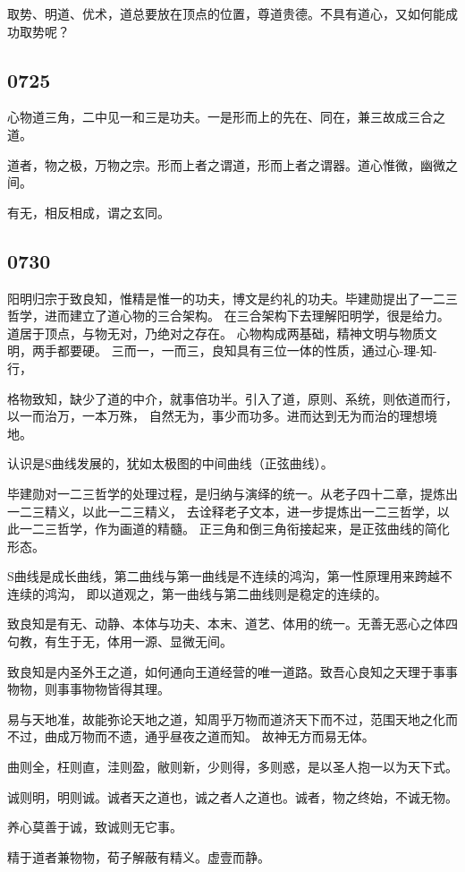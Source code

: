 取势、明道、优术，道总要放在顶点的位置，尊道贵德。不具有道心，又如何能成功取势呢？

\subsection{0725}

心物道三角，二中见一和三是功夫。一是形而上的先在、同在，兼三故成三合之道。

道者，物之极，万物之宗。形而上者之谓道，形而上者之谓器。道心惟微，幽微之间。

有无，相反相成，谓之玄同。



\subsection{0730}

阳明归宗于致良知，惟精是惟一的功夫，博文是约礼的功夫。毕建勋提出了一二三哲学，进而建立了道心物的三合架构。
在三合架构下去理解阳明学，很是给力。道居于顶点，与物无对，乃绝对之存在。
心物构成两基础，精神文明与物质文明，两手都要硬。
三而一，一而三，良知具有三位一体的性质，通过心-理-知-行，

格物致知，缺少了道的中介，就事倍功半。引入了道，原则、系统，则依道而行，以一而治万，一本万殊，
自然无为，事少而功多。进而达到无为而治的理想境地。

认识是S曲线发展的，犹如太极图的中间曲线（正弦曲线）。

毕建勋对一二三哲学的处理过程，是归纳与演绎的统一。从老子四十二章，提炼出一二三精义，以此一二三精义，
去诠释老子文本，进一步提炼出一二三哲学，以此一二三哲学，作为画道的精髓。
正三角和倒三角衔接起来，是正弦曲线的简化形态。

S曲线是成长曲线，第二曲线与第一曲线是不连续的鸿沟，第一性原理用来跨越不连续的鸿沟，
即以道观之，第一曲线与第二曲线则是稳定的连续的。

致良知是有无、动静、本体与功夫、本末、道艺、体用的统一。无善无恶心之体四句教，有生于无，体用一源、显微无间。

致良知是内圣外王之道，如何通向王道经营的唯一道路。致吾心良知之天理于事事物物，则事事物物皆得其理。

易与天地准，故能弥论天地之道，知周乎万物而道济天下而不过，范围天地之化而不过，曲成万物而不遗，通乎昼夜之道而知。
故神无方而易无体。

曲则全，枉则直，洼则盈，敝则新，少则得，多则惑，是以圣人抱一以为天下式。

诚则明，明则诚。诚者天之道也，诚之者人之道也。诚者，物之终始，不诚无物。

养心莫善于诚，致诚则无它事。

精于道者兼物物，荀子解蔽有精义。虚壹而静。
